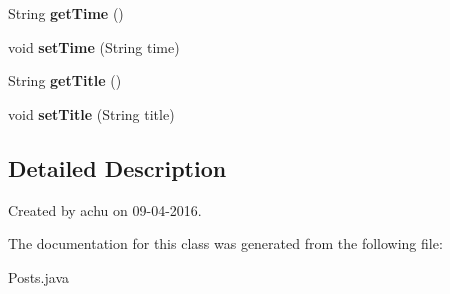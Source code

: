 \begin{DoxyCompactItemize}
\item 
\hypertarget{classcom_1_1example_1_1sel_1_1lostfound_1_1Posts_a0872388ed7ec381a86f048bf6a5bf5c9}{String {\bfseries get\-Time} ()}\label{classcom_1_1example_1_1sel_1_1lostfound_1_1Posts_a0872388ed7ec381a86f048bf6a5bf5c9}

\item 
\hypertarget{classcom_1_1example_1_1sel_1_1lostfound_1_1Posts_ab61e2cf2af2faf0b07bb46165befb3d0}{void {\bfseries set\-Time} (String time)}\label{classcom_1_1example_1_1sel_1_1lostfound_1_1Posts_ab61e2cf2af2faf0b07bb46165befb3d0}

\item 
\hypertarget{classcom_1_1example_1_1sel_1_1lostfound_1_1Posts_aa16203c629985858be8b80f1ed720c24}{String {\bfseries get\-Title} ()}\label{classcom_1_1example_1_1sel_1_1lostfound_1_1Posts_aa16203c629985858be8b80f1ed720c24}

\item 
\hypertarget{classcom_1_1example_1_1sel_1_1lostfound_1_1Posts_a5028297b56d5feb7d6f2b0a0fbc859ad}{void {\bfseries set\-Title} (String title)}\label{classcom_1_1example_1_1sel_1_1lostfound_1_1Posts_a5028297b56d5feb7d6f2b0a0fbc859ad}

\end{DoxyCompactItemize}


\subsection{Detailed Description}
Created by achu on 09-\/04-\/2016. 

The documentation for this class was generated from the following file\-:\begin{DoxyCompactItemize}
\item 
Posts.\-java\end{DoxyCompactItemize}
